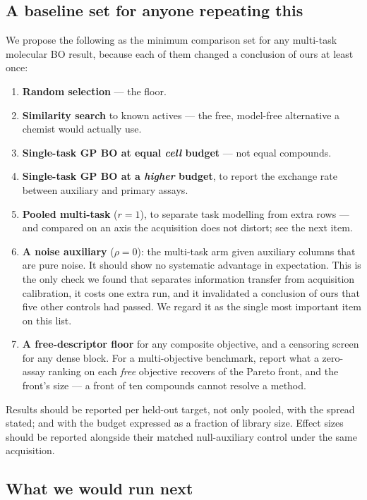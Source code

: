\documentclass[11pt]{article}
\begin{document}
\subsection{A baseline set for anyone repeating this}

We propose the following as the minimum comparison set for any multi-task
molecular BO result, because each of them changed a conclusion of ours at least
once:

\begin{enumerate}[leftmargin=1.6em,itemsep=0.2em]
  \item \textbf{Random selection} --- the floor.
  \item \textbf{Similarity search} to known actives --- the free, model-free
    alternative a chemist would actually use.
  \item \textbf{Single-task GP BO at equal \emph{cell} budget} --- not equal
    compounds.
  \item \textbf{Single-task GP BO at a \emph{higher} budget}, to report the
    exchange rate between auxiliary and primary assays.
  \item \textbf{Pooled multi-task} ($r = 1$), to separate task modelling from
    extra rows --- and compared on an axis the acquisition does not distort;
    see the next item.
  \item \textbf{A noise auxiliary} ($\rho = 0$): the multi-task arm
    given auxiliary columns that are pure noise. It should show no systematic advantage in expectation. This is the only check we found that separates information transfer
    from acquisition calibration, it costs one extra run, and it invalidated a
    conclusion of ours that five other controls had passed. We regard it as the
    single most important item on this list.
  \item \textbf{A free-descriptor floor} for any composite objective, and a
    censoring screen for any dense block. For a multi-objective benchmark, report
    what a zero-assay ranking on each \emph{free} objective recovers of the
    Pareto front, and the front's size --- a front of ten compounds cannot
    resolve a method.
\end{enumerate}

Results should be reported per held-out target, not only pooled, with the spread
stated; and with the budget expressed as a fraction of library size. Effect
sizes should be reported alongside their matched null-auxiliary control under
the same acquisition.

\subsection{What we would run next}
\label{sec:next}
\end{document}
